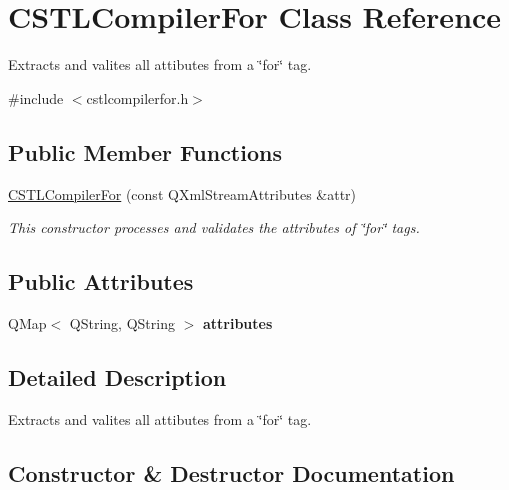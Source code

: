 \hypertarget{class_c_s_t_l_compiler_for}{}\section{C\+S\+T\+L\+Compiler\+For Class Reference}
\label{class_c_s_t_l_compiler_for}


Extracts and valites all attibutes from a \char`\"{}for\char`\"{} tag.  




{\ttfamily \#include $<$cstlcompilerfor.\+h$>$}

\subsection*{Public Member Functions}
\begin{DoxyCompactItemize}
\item 
\hyperlink{class_c_s_t_l_compiler_for_aca7bad2177039289422199d9ea224ed9}{C\+S\+T\+L\+Compiler\+For} (const Q\+Xml\+Stream\+Attributes \&attr)
\begin{DoxyCompactList}\small\item\em This constructor processes and validates the attributes of \char`\"{}for\char`\"{} tags. \end{DoxyCompactList}\end{DoxyCompactItemize}
\subsection*{Public Attributes}
\begin{DoxyCompactItemize}
\item 
\mbox{\label{class_c_s_t_l_compiler_for_af3fc4b37c220af702aa93ea69b99cec6}} 
Q\+Map$<$ Q\+String, Q\+String $>$ {\bfseries attributes}
\end{DoxyCompactItemize}


\subsection{Detailed Description}
Extracts and valites all attibutes from a \char`\"{}for\char`\"{} tag. 

\subsection{Constructor \& Destructor Documentation}
\mbox{\label{class_c_s_t_l_compiler_for_aca7bad2177039289422199d9ea224ed9}} 
